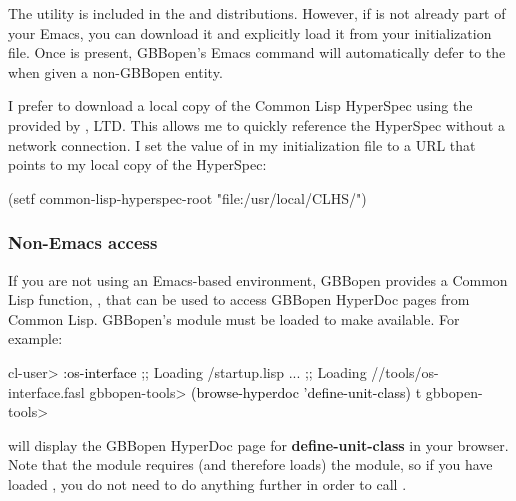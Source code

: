 \documentclass[10pt,twoside,english,pdftex]{article}
\begin{document}
The
utility is included in the
 and
 distributions.
However, if  is not already part of your Emacs, you
can download it and explicitly load it from your  initialization
file.  Once  is present, GBBopen's
 Emacs command will automatically defer to the
 when given a
non-GBBopen entity.

I prefer to download a local copy of the Common Lisp HyperSpec using the
provided by , LTD.  This allows
me to quickly reference the HyperSpec without a network connection.  I set the
value of  in my 
initialization file to a URL that points to my local copy of the HyperSpec:
%
\W\supp
\begin{example}
  (setf common-lisp-hyperspec-root "file:/usr/local/CLHS/")
\end{example}

\subsubsection*{Non-Emacs access}

%
If you are not using an Emacs-based environment, GBBopen provides a Common
Lisp function, , that can be used to access
GBBopen HyperDoc pages from Common Lisp.  GBBopen's
 module must be loaded to make
 available.  For example:
%
\W\supp
\begin{example}
\textcolor{darkergray}{%
  cl-user> \textcolor{black}{:os-interface}
  ;; Loading /startup.lisp
     ...
  ;; Loading //tools/os-interface.fasl
  gbbopen-tools> \textcolor{black}{(browse-hyperdoc 'define-unit-class)}
  t
  gbbopen-tools>}
\end{example}
%
will display the GBBopen HyperDoc page for \textbf{define-unit-class} in your
browser.  Note that the  module requires (and
therefore loads) the  module, so if you have loaded
, you do not need to do anything further in order
to call .
\end{document}
